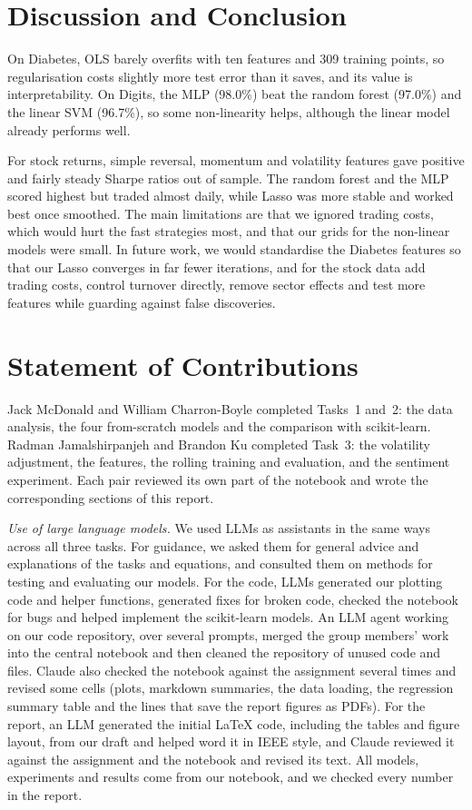 \documentclass[conference]{IEEEtran}
\begin{document}
\section{Discussion and Conclusion}
On Diabetes, OLS barely overfits with ten features and 309 training points, so regularisation costs slightly more test error than it saves, and its value is interpretability. On Digits, the MLP (98.0\%) beat the random forest (97.0\%) and the linear SVM (96.7\%), so some non-linearity helps, although the linear model already performs well.

For stock returns, simple reversal, momentum and volatility features gave positive and fairly steady Sharpe ratios out of sample. The random forest and the MLP scored highest but traded almost daily, while Lasso was more stable and worked best once smoothed. The main limitations are that we ignored trading costs, which would hurt the fast strategies most, and that our grids for the non-linear models were small. In future work, we would standardise the Diabetes features so that our Lasso converges in far fewer iterations, and for the stock data add trading costs, control turnover directly, remove sector effects and test more features while guarding against false discoveries.

\section{Statement of Contributions}
Jack McDonald and William Charron-Boyle completed Tasks~1 and~2: the data analysis, the four from-scratch models and the comparison with scikit-learn. Radman Jamalshirpanjeh and Brandon Ku completed Task~3: the volatility adjustment, the features, the rolling training and evaluation, and the sentiment experiment. Each pair reviewed its own part of the notebook and wrote the corresponding sections of this report.

\textit{Use of large language models.} We used LLMs as assistants in the same ways across all three tasks. For guidance, we asked them for general advice and explanations of the tasks and equations, and consulted them on methods for testing and evaluating our models. For the code, LLMs generated our plotting code and helper functions, generated fixes for broken code, checked the notebook for bugs and helped implement the scikit-learn models. An LLM agent working on our code repository, over several prompts, merged the group members' work into the central notebook and then cleaned the repository of unused code and files. Claude also checked the notebook against the assignment several times and revised some cells (plots, markdown summaries, the data loading, the regression summary table and the lines that save the report figures as PDFs). For the report, an LLM generated the initial \LaTeX{} code, including the tables and figure layout, from our draft and helped word it in IEEE style, and Claude reviewed it against the assignment and the notebook and revised its text. All models, experiments and results come from our notebook, and we checked every number in the report.
\end{document}
